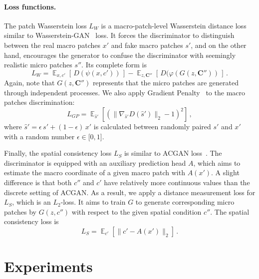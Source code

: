 \documentclass{article}
\newcommand{\expectation}{\mathop{\mathbb{E}}}
\begin{document}
    \paragraph{Loss functions.} The patch Wasserstein loss $L_W$ is a macro-patch-level Wasserstein distance loss similar to Wasserstein-GAN~\cite{WGAN} loss. It forces the discriminator to distinguish between the real macro patches $x'$ and fake macro patches $s'$, and on the other hand, encourages the generator to confuse the discriminator with seemingly realistic micro patches $s''$. Its complete form is
    \begin{equation} 
        L_W = \displaystyle \expectation_{x,c'} \left[ \, D(\psi(x,c')) \, \right] - \expectation_{z,\bm{C}''} \left[ \, D(\varphi(G(z,\bm{C}'')) \, \right] \,. 
    \end{equation}
Again, note that $G(z,\bm{C}'')$ represents that the micro patches are generated through independent processes. We also apply Gradient Penalty~\cite{WGAN-GP} to the macro patches discrimination:
    \begin{equation} 
    L_{GP} = \displaystyle \expectation_{\hat{s}'} \left[ ( \| \nabla_{\hat{s}'} D(\hat{s}') \|_2 - 1 )^2 \right]  \, ,
    \end{equation}
    where $\hat{s}' = \epsilon \, s' + (1-\epsilon) \, x'$ is calculated between randomly paired $s'$ and $x'$ with a random number $\epsilon \in \big[0, 1\big]$.

    Finally, the spatial consistency loss $L_S$ is similar to ACGAN loss~\cite{ACGAN}. The discriminator is equipped with an auxiliary prediction head $A$, which aims to estimate the macro coordinate of a given macro patch with $A(x')$. A slight difference is that both $c''$ and $c'$ have relatively more continuous values than the discrete setting of ACGAN. As a result, we apply a distance measurement loss for $L_S$, which is an $L_2$-loss. It aims to train $G$ to generate corresponding micro patches by $G(z,c'')$ with respect to the given spatial condition $c''$. The spatial consistency loss is
    \begin{equation}
        L_S = \displaystyle \expectation_{c'} \left[ \| c' - A(x') \|_2 \right] \, .
    \end{equation} 



 \section{Experiments}
\end{document}
